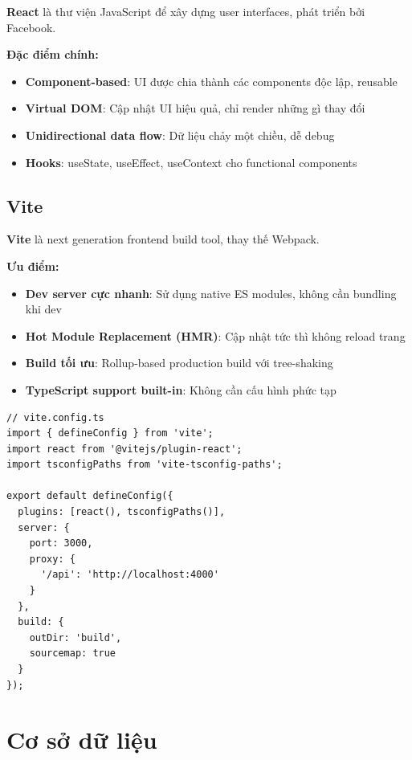 \documentclass[12pt]{extreport}
\begin{document}
\textbf{React} là thư viện JavaScript để xây dựng user interfaces, phát triển bởi Facebook.

\textbf{Đặc điểm chính:}
\begin{itemize}
    \item \textbf{Component-based}: UI được chia thành các components độc lập, reusable
    \item \textbf{Virtual DOM}: Cập nhật UI hiệu quả, chỉ render những gì thay đổi
    \item \textbf{Unidirectional data flow}: Dữ liệu chảy một chiều, dễ debug
    \item \textbf{Hooks}: useState, useEffect, useContext cho functional components
\end{itemize}

\subsection{Vite}

\textbf{Vite} là next generation frontend build tool, thay thế Webpack.

\textbf{Ưu điểm:}
\begin{itemize}
    \item \textbf{Dev server cực nhanh}: Sử dụng native ES modules, không cần bundling khi dev
    \item \textbf{Hot Module Replacement (HMR)}: Cập nhật tức thì không reload trang
    \item \textbf{Build tối ưu}: Rollup-based production build với tree-shaking
    \item \textbf{TypeScript support built-in}: Không cần cấu hình phức tạp
\end{itemize}

\begin{lstlisting}[style=TypeScriptStyle, caption={Vite Configuration}]
// vite.config.ts
import { defineConfig } from 'vite';
import react from '@vitejs/plugin-react';
import tsconfigPaths from 'vite-tsconfig-paths';

export default defineConfig({
  plugins: [react(), tsconfigPaths()],
  server: {
    port: 3000,
    proxy: {
      '/api': 'http://localhost:4000'
    }
  },
  build: {
    outDir: 'build',
    sourcemap: true
  }
});
\end{lstlisting}

\section{Cơ sở dữ liệu}
\end{document}
